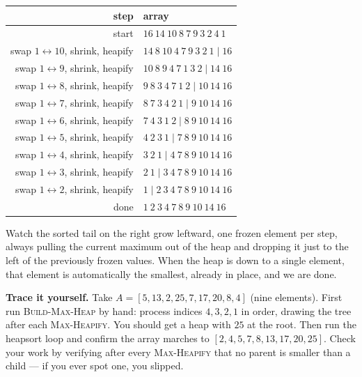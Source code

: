 \begin{center}
\renewcommand{\arraystretch}{1.25}
\begin{tabular}{r l}
\toprule
step & array \\
\midrule
start         & $16\ 14\ 10\ 8\ 7\ 9\ 3\ 2\ 4\ 1$ \\
swap $1\leftrightarrow10$, shrink, heapify
              & $14\ 8\ 10\ 4\ 7\ 9\ 3\ 2\ 1 \mid 16$ \\
swap $1\leftrightarrow 9$, shrink, heapify
              & $10\ 8\ 9\ 4\ 7\ 1\ 3\ 2 \mid 14\ 16$ \\
swap $1\leftrightarrow 8$, shrink, heapify
              & $9\ 8\ 3\ 4\ 7\ 1\ 2 \mid 10\ 14\ 16$ \\
swap $1\leftrightarrow 7$, shrink, heapify
              & $8\ 7\ 3\ 4\ 2\ 1 \mid 9\ 10\ 14\ 16$ \\
swap $1\leftrightarrow 6$, shrink, heapify
              & $7\ 4\ 3\ 1\ 2 \mid 8\ 9\ 10\ 14\ 16$ \\
swap $1\leftrightarrow 5$, shrink, heapify
              & $4\ 2\ 3\ 1 \mid 7\ 8\ 9\ 10\ 14\ 16$ \\
swap $1\leftrightarrow 4$, shrink, heapify
              & $3\ 2\ 1 \mid 4\ 7\ 8\ 9\ 10\ 14\ 16$ \\
swap $1\leftrightarrow 3$, shrink, heapify
              & $2\ 1 \mid 3\ 4\ 7\ 8\ 9\ 10\ 14\ 16$ \\
swap $1\leftrightarrow 2$, shrink, heapify
              & $1 \mid 2\ 3\ 4\ 7\ 8\ 9\ 10\ 14\ 16$ \\
\midrule
done          & $1\ 2\ 3\ 4\ 7\ 8\ 9\ 10\ 14\ 16$ \\
\bottomrule
\end{tabular}
\end{center}

Watch the sorted tail on the right grow leftward, one frozen element per step,
always pulling the current maximum out of the heap and dropping it just to the
left of the previously frozen values. When the heap is down to a single element,
that element is automatically the smallest, already in place, and we are done.

\begin{labbox}
\textbf{Trace it yourself.} Take $A = [5, 13, 2, 25, 7, 17, 20, 8, 4]$ (nine
elements). First run \textsc{Build-Max-Heap} by hand: process indices $4,3,2,1$
in order, drawing the tree after each \textsc{Max-Heapify}. You should get a heap
with $25$ at the root. Then run the heapsort loop and confirm the array marches
to $[2,4,5,7,8,13,17,20,25]$. Check your work by verifying after every
\textsc{Max-Heapify} that no parent is smaller than a child --- if you ever spot
one, you slipped.
\end{labbox}

